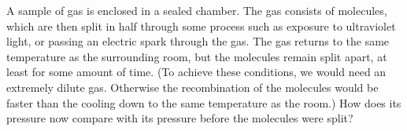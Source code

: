 A sample of gas is enclosed in a sealed chamber. The gas consists of
molecules, which are then split in half through some process such as
exposure to ultraviolet light, or passing an electric spark through the
gas. The gas returns to the same temperature as the surrounding
room, but the molecules remain split apart, at least for some amount
of time. (To achieve these conditions, we would need an extremely dilute gas.
Otherwise the recombination of the molecules would be faster than the cooling
down to the same temperature as the room.) How does its pressure now compare with its pressure before the
molecules were split?
